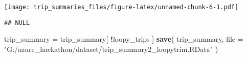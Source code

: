 \documentclass[]{article}
\newenvironment{Shaded}{\begin{snugshade}}{\end{snugshade}}
\newcommand{\DataTypeTok}[1]{\textcolor[rgb]{0.13,0.29,0.53}{#1}}
\newcommand{\DecValTok}[1]{\textcolor[rgb]{0.00,0.00,0.81}{#1}}
\newcommand{\KeywordTok}[1]{\textcolor[rgb]{0.13,0.29,0.53}{\textbf{#1}}}
\newcommand{\NormalTok}[1]{#1}
\newcommand{\OperatorTok}[1]{\textcolor[rgb]{0.81,0.36,0.00}{\textbf{#1}}}
\newcommand{\OtherTok}[1]{\textcolor[rgb]{0.56,0.35,0.01}{#1}}
\newcommand{\StringTok}[1]{\textcolor[rgb]{0.31,0.60,0.02}{#1}}
\begin{document}
\begin{Shaded}
\end{Shaded}

\texttt{[image: trip\_summaries\_files/figure-latex/unnamed-chunk-6-1.pdf]}

\begin{verbatim}
## NULL
\end{verbatim}

\begin{Shaded}
\begin{Highlighting}[]
\NormalTok{trip_summary =}\StringTok{ }\NormalTok{trip_summary[ }\OperatorTok{!}\NormalTok{loopy_trips ]}
\KeywordTok{save}\NormalTok{( trip_summary, }\DataTypeTok{file =}  \StringTok{"G:/azure_hackathon/dataset/trip_summary2_loopytrim.RData"}\NormalTok{ )}
\end{Highlighting}
\end{Shaded}
\end{document}
